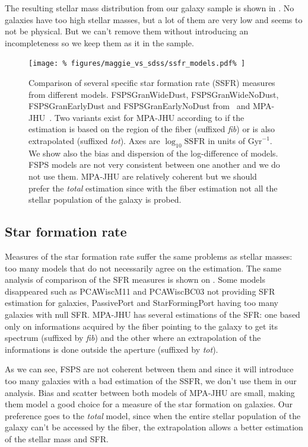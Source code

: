 The resulting stellar mass distribution from our galaxy sample is shown in
. No galaxies have too high stellar
masses, but a lot of them are very low and seems to not be physical. But we
can't remove them without introducing an incompleteness so we keep them as
it in the sample.

\begin{figure}[htp]
    \centering
    \texttt{[image: \%
        figures/maggie\_vs\_sdss/ssfr\_models.pdf\%
    ]}
    \caption{Comparison of several specific star formation rate (SSFR) measures
        from different models. FSPSGranWideDust, FSPSGranWideNoDust,
        FSPSGranEarlyDust and FSPSGranEarlyNoDust from~\cite{Conroy+09} and
        MPA-JHU~\cite{Brinchmann+04, Kauffmann+03, Tremonti+04}. Two variants
        exist for MPA-JHU according to if the estimation is based on the region
        of the fiber (suffixed \emph{fib}) or is also extrapolated (suffixed
        \emph{tot}). Axes are $\log_{10} \mathrm{SSFR}$ in units of
        $\mathrm{Gyr}^{-1}$. We show also the bias and dispersion of the
        log-difference of models. FSPS models are not very consistent between
        one another and we do not use them. MPA-JHU are relatively coherent but
    we should prefer the \emph{total} estimation since with the fiber
estimation not all the stellar population of the galaxy is
probed.\label{fig:sfr_comparison}}
\end{figure}

\subsection{Star formation rate}
\label{sub:star_formation_rate}

Measures of the star formation rate suffer the same problems as stellar
masses: too many models that do not necessarily agree on the estimation. The
same analysis of comparison of the SFR measures is shown on
. Some models disappeared such as PCAWiscM11
and PCAWiscBC03 not providing SFR estimation for galaxies, PassivePort and
StarFormingPort having too many galaxies with null SFR\@. MPA-JHU has
several estimations of the SFR\@: one based only on informations acquired by
the fiber pointing to the galaxy to get its spectrum (suffixed by
\emph{fib}) and the other where an extrapolation of the informations is done
outside the aperture (suffixed by \emph{tot}).

As we can see, FSPS are not coherent between them and since it will
introduce too many galaxies with a bad estimation of the SSFR, we don't use
them in our analysis. Bias and scatter between both models of MPA-JHU are
small, making them model a good choice for a measure of the star formation
on galaxies. Our preference goes to the \emph{total} model, since when the
entire stellar population of the galaxy can't be accessed by the fiber, the
extrapolation allows a better estimation of the stellar mass and SFR\@.

